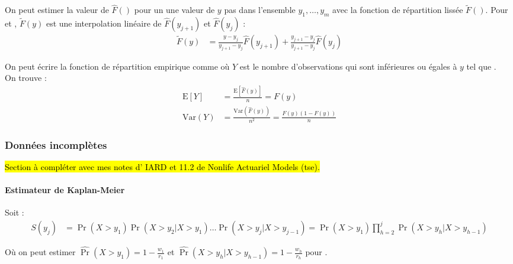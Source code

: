 \documentclass[10pt, french]{article}
\begin{document}
\begin{multicols*}{2}
On peut estimer la valeur de $\hat{F}()$ pour un une valeur de $y$ pas dans l'ensemble $y_{1}, \dots, y_{m}$ avec la fonction de répartition lissée $\tilde{F}()$. Pour  et , $\tilde{F}(y)$ est une interpolation linéaire de $\hat{F}(y_{j + 1})$ et $\hat{F}(y_{j})$ :
\begin{align*}
	\tilde{F}(y)
	&=	\frac{y	-	y_{j	}}{y_{j + 1}	-	y_{j}}\hat{F}(y_{j + 1})  + 
		\frac{y_{j + 1}	-	y_{j	}}{y_{j + 1}	-	y_{j}}\hat{F}(y_{j})
\end{align*}

\begin{definitionNOHFILLprop}
On peut écrire la fonction de répartition empirique comme  où $Y$ est le nombre d'observations qui sont inférieures ou égales à $y$ tel que .\\

On trouve :
\begin{align*}
	\text{E}[Y]	
	&=	\frac{\text{E}[\hat{F}(y)]}{n}
	=	F(y)		\\
	\text{Var}(Y)
	&=	\frac{\text{Var}(\hat{F}(y))}{n^{2}}
	=	\frac{F(y)(1 - F(y))}{n}
\end{align*}
\end{definitionNOHFILLprop}



\columnbreak
\subsubsection{Données incomplètes}
\hl{Section à compléter avec mes notes d’ IARD et 11.2 de Nonlife Actuariel Models (tse).}
\paragraph{Estimateur de Kaplan-Meier}
Soit : 
\begin{align*}
	S(y_{j})
	&=	\Pr(X > y_{1})	\Pr(X > y_{2} | X > y_{1}) \hdots \Pr(X > y_{j} | X > y_{j - 1})
	=	\Pr(X > y_{1}) \prod_{h = 2}^{j} \Pr(X > y_{h} | X > y_{h - 1})
\end{align*}

Où on peut estimer $\widehat{\Pr}(X > y_{1})	=	1	-	\frac{w_{1}}{r_{1}}$ et $\widehat{\Pr}(X > y_{h} | X > y_{h - 1})	=	1	-	\frac{w_{h}}{r_{h}}$ pour .


\end{multicols*}
\end{document}

